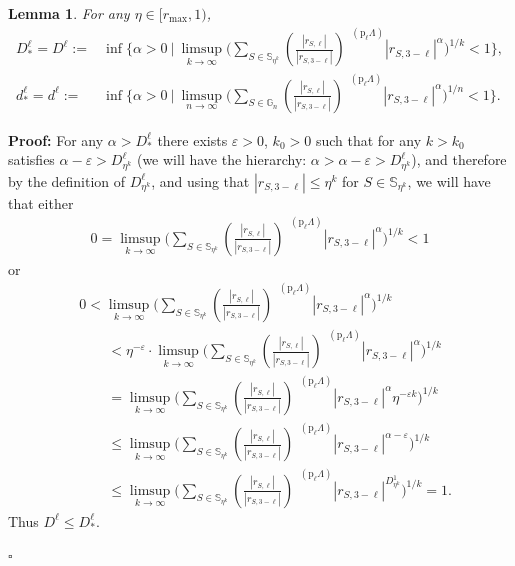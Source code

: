 \documentclass[a4paper, 11pt]{article}
\newenvironment{Proof}{\noindent \textbf{Proof:}}{\hfill$\square$\\}
\DeclareMathOperator{\dB}{\dim_{\mathrm{B}}}
\numberwithin{equation}{section}
\theoremstyle{plain}
\newtheorem{lemma}[theorem]{Lemma}
\theoremstyle{remark}
\theoremstyle{definition}
\begin{document}
\begin{lemma} \label{lemma:bpn22}
For any $\eta \in [r_{\max},1)$,
\begin{align*}
D_*^\ell = D^\ell := &\inf \Bigg\{ \alpha > 0 \ \Bigg| \ \limsup_{k \to \infty} \Bigg( \sum_{S \in \mathbb{S}_{\eta^k}} \left( \frac{|r_{S,\ell}|}{|r_{S,3-\ell}|} \right)^{\dB(\mathrm{p}_\ell\Lambda)} |r_{S,3-\ell}|^{\alpha}\Bigg)^{1/k} < 1 \Bigg\}, \\
d_*^\ell = d^\ell := &\inf \Bigg\{ \alpha > 0 \ \Bigg| \ \limsup_{n \to \infty} \Bigg( \sum_{S \in \mathbb{G}_n} \left( \frac{|r_{S,\ell}|}{|r_{S,3-\ell}|} \right)^{\dB(\mathrm{p}_\ell\Lambda)} |r_{S,3-\ell}|^{\alpha}\Bigg)^{1/n} < 1 \Bigg\}.
\end{align*}
\end{lemma}
\begin{Proof}
For any $\alpha > D_*^\ell$ there exists $\varepsilon > 0$, $k_0 >0 $ such that for any $k > k_0$ satisfies $\alpha - \varepsilon > D_{\eta^k}^\ell$ (we will have the hierarchy: $\alpha>\alpha-\varepsilon>D_{\eta^k}^\ell$), and therefore by the definition of $D_{\eta^k}^\ell$, and using that $|r_{S,3-\ell}| \leq \eta^k$ for $S \in \mathbb{S}_{\eta^k}$, we will have that either
\begin{align*}
0=\limsup_{k \to \infty} \Bigg( \sum_{S \in \mathbb{S}_{\eta^k}} \left( \frac{|r_{S,\ell}|}{|r_{S,3-\ell}|} \right)^{\dB(\mathrm{p}_\ell\Lambda)} |r_{S,3-\ell}|^{\alpha}\Bigg)^{1/k} < 1
\end{align*} or
\begin{align*}
&0<\limsup_{k \to \infty} \Bigg( \sum_{S \in \mathbb{S}_{\eta^k}} \left( \frac{|r_{S,\ell}|}{|r_{S,3-\ell}|} \right)^{\dB(\mathrm{p}_\ell\Lambda)} |r_{S,3-\ell}|^{\alpha}\Bigg)^{1/k} \\
& \qquad < \eta^{-\varepsilon} \cdot \limsup_{k \to \infty} \Bigg( \sum_{S \in \mathbb{S}_{\eta^k}} \left( \frac{|r_{S,\ell}|}{|r_{S,3-\ell}|} \right)^{\dB(\mathrm{p}_\ell\Lambda)} |r_{S,3-\ell}|^{\alpha}\Bigg)^{1/k} \\
& \qquad = \limsup_{k \to \infty} \Bigg(\sum_{S \in \mathbb{S}_{\eta^k}} \left( \frac{|r_{S,\ell}|}{|r_{S,3-\ell}|} \right)^{\dB(\mathrm{p}_\ell\Lambda)} |r_{S,3-\ell}|^{\alpha} \eta^{-\varepsilon k}\Bigg)^{1/k} \\
& \qquad \leq \limsup_{k \to \infty} \Bigg( \sum_{S \in \mathbb{S}_{\eta^k}} \left( \frac{|r_{S,\ell}|}{|r_{S,3-\ell}|} \right)^{\dB(\mathrm{p}_\ell\Lambda)} |r_{S,3-\ell}|^{\alpha - \varepsilon}\Bigg)^{1/k} \\
& \qquad \leq \limsup_{k \to \infty} \Bigg( \sum_{S \in \mathbb{S}_{\eta^k}} \left( \frac{|r_{S,\ell}|}{|r_{S,3-\ell}|} \right)^{\dB(\mathrm{p}_\ell\Lambda)} |r_{S,3-\ell}|^{D_{\eta^k}^1}\Bigg)^{1/k} = 1.
\end{align*}
Thus $D^\ell \leq D_*^\ell$.


\end{Proof}
\end{document}
